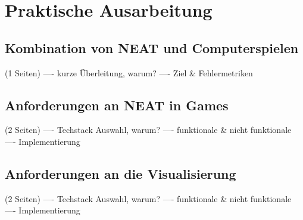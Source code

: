 \chapter{Praktische Ausarbeitung}
\label{chapter:3}
\section{Kombination von NEAT und Computerspielen}
(1 Seiten)
---- kurze Überleitung, warum?
---- Ziel \& Fehlermetriken

\section{Anforderungen an NEAT in Games}
(2 Seiten)
---- Techstack Auswahl, warum?
---- funktionale \& nicht funktionale
---- Implementierung  

\section{Anforderungen an die Visualisierung}
(2 Seiten)
---- Techstack Auswahl, warum?
---- funktionale \& nicht funktionale
---- Implementierung 